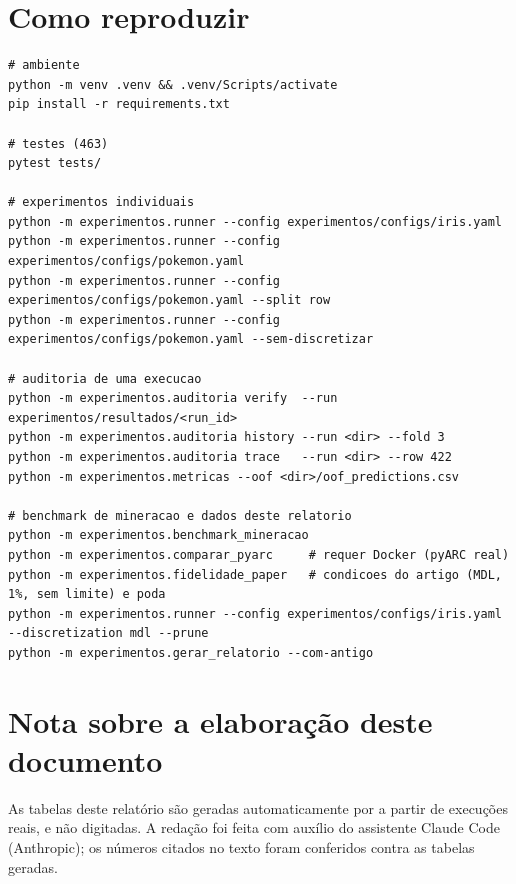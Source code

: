 \documentclass[a4paper,11pt]{article}
\newcommand{\code}[1]{\texttt{\detokenize{#1}}}
\begin{document}
\appendix
\section{Como reproduzir}
\begin{verbatim}
# ambiente
python -m venv .venv && .venv/Scripts/activate
pip install -r requirements.txt

# testes (463)
pytest tests/

# experimentos individuais
python -m experimentos.runner --config experimentos/configs/iris.yaml
python -m experimentos.runner --config experimentos/configs/pokemon.yaml
python -m experimentos.runner --config experimentos/configs/pokemon.yaml --split row
python -m experimentos.runner --config experimentos/configs/pokemon.yaml --sem-discretizar

# auditoria de uma execucao
python -m experimentos.auditoria verify  --run experimentos/resultados/<run_id>
python -m experimentos.auditoria history --run <dir> --fold 3
python -m experimentos.auditoria trace   --run <dir> --row 422
python -m experimentos.metricas --oof <dir>/oof_predictions.csv

# benchmark de mineracao e dados deste relatorio
python -m experimentos.benchmark_mineracao
python -m experimentos.comparar_pyarc     # requer Docker (pyARC real)
python -m experimentos.fidelidade_paper   # condicoes do artigo (MDL, 1%, sem limite) e poda
python -m experimentos.runner --config experimentos/configs/iris.yaml --discretization mdl --prune
python -m experimentos.gerar_relatorio --com-antigo
\end{verbatim}

\section{Nota sobre a elabora\c{c}\~ao deste documento}
As tabelas deste relat\'orio s\~ao geradas automaticamente por \code{experimentos/gerar_relatorio.py} a partir de execu\c{c}\~oes reais, e n\~ao digitadas. A reda\c{c}\~ao foi feita com aux\'ilio do assistente Claude Code (Anthropic); os n\'umeros citados no texto foram conferidos contra as tabelas geradas.
\end{document}
